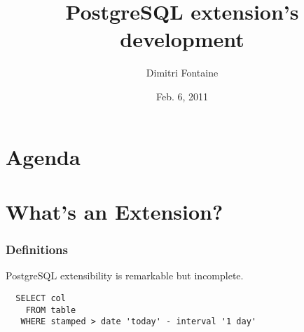 \documentclass[english]{beamer}
\title{PostgreSQL extension's development}
\author{Dimitri Fontaine}
\date{Feb. 6, 2011}
\begin{document}
\frame{\titlepage}

\section*{Agenda}

\section{What's an Extension?}

\begin{frame}[fragile]
  \frametitle{Definitions}

  \begin{center}
    PostgreSQL extensibility is remarkable but incomplete. 
  \end{center}

\begin{example}
\begin{verbatim}
  SELECT col
    FROM table
   WHERE stamped > date 'today' - interval '1 day'
\end{verbatim}
\end{example}
\end{frame}
\end{document}
